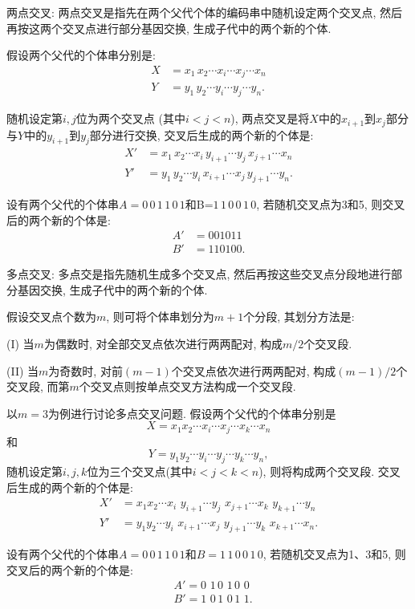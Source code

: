      两点交叉: 两点交叉是指先在两个父代个体的编码串中随机设定两个交叉点, 然后再按这两个交叉点进行部分基因交换, 生成子代中的两个新的个体.

假设两个父代的个体串分别是:
\begin{align*}
    X&=x_1\, x_2 \cdots x_i \cdots x_j \cdots x_n\\
    Y&=y_1\, y_2 \cdots y_i \cdots y_j \cdots y_n.
\end{align*}

随机设定第$i,j$位为两个交叉点 (其中$i<j<n$), 两点交叉是将$X$中的$x_{i+1}$到$x_j$部分与$Y$中的$y_{i+1}$到$y_j$部分进行交换, 交叉后生成的两个新的个体是:
\begin{align*}
    X'&= x_1\, x_2 \cdots x_i\, y_{i+1} \cdots y_j\, x_{j+1} \cdots x_n\\
    Y'&= y_1\, y_2  \cdots y_i\, x_{i+1} \cdots x_j\, y_{j+1} \cdots y_n.
\end{align*}

\begin{example}
设有两个父代的个体串$A= 0\, 0\,  1\,  1\,  0\,  1$和B=$1\,  1\,  0\,  0\,  1\,  0$, 若随机交叉点为3和5, 则交叉后的两个新的个体是:
\begin{align*}
     A'&= 0 0 1 0 1 1\\
    B'&= 1 1 0 1 0 0.
\end{align*}
\vspace{-0.5cm}
\end{example}

     多点交叉: 多点交是指先随机生成多个交叉点, 然后再按这些交叉点分段地进行部分基因交换, 生成子代中的两个新的个体.

假设交叉点个数为$m$, 则可将个体串划分为$m+1$个分段, 其划分方法是:

\qquad (I) 当$m$为偶数时, 对全部交叉点依次进行两两配对, 构成$m/2$个交叉段.

\qquad (II) 当$m$为奇数时, 对前$(m-1)$个交叉点依次进行两两配对, 构成$(m-1)/2$个交叉段, 而第$m$个交叉点则按单点交叉方法构成一个交叉段.

\begin{example}
以$m=3$为例进行讨论多点交叉问题. 假设两个父代的个体串分别是$$X=x_1 x_2 \cdots x_i \cdots x_j \cdots x_k \cdots x_n$$和$$Y=y_1 y_2 \cdots y_i \cdots y_j \cdots y_k \cdots y_n,$$
随机设定第$i,j,k$位为三个交叉点(其中$i<j<k<n$), 则将构成两个交叉段. 交叉后生成的两个新的个体是:
\begin{align*}
  X'&= x_1 x_2 \cdots x_i  \,\,y_{i+1} \cdots y_j \,\,x_{j+1} \cdots x_k \,\,y_{k+1} \cdots y_n\\
  Y'&= y_1 y_2 \cdots y_i\,\, x_{i+1} \cdots x_j\,\, y_{j+1} \cdots y_k \,\,x_{k+1} \cdots x_n.
\end{align*}

设有两个父代的个体串$A= 0\, 0\, 1\, 1\, 0\, 1$和$B= 1\, 1\, 0\, 0\, 1\, 0$, 若随机交叉点为1、3和5, 则交叉后的两个新的个体是:
\begin{align*}
    &A'= 0\,\, 1\, 0\,\, 1\, 0\,\, 0\\
    &B'= 1\,\, 0\, 1\,\, 0\, 1\,\, 1.
\end{align*}
\vspace{-0.4cm}
\end{example}

